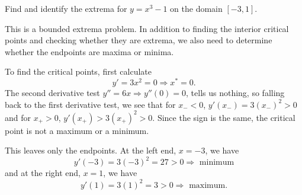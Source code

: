 \documentclass{ximera}
\author{Emma Smith Zbarsky}
\begin{document}
\begin{exercise}

Find and identify the extrema for $y = x^3-1$ on the domain $[-3,1]$.


\begin{hint}
This is a bounded extrema problem. In addition to finding the interior
critical points and checking whether they are extrema, we also need to
determine whether the endpoints are maxima or minima.
\end{hint}


\begin{hint}
To find the critical points, first calculate
\[y' = 3x^2 = 0 \Rightarrow x^*=0.\] The second derivative test
$y'' = 6x \Rightarrow y''(0)=0$, tells us nothing, so falling back to
the first derivative test, we see that for $x_- < 0$,
$y'(x_-)=3(x_-)^2 > 0$ and for $x_+>0$, $y'(x_+) > 3(x_+)^2 > 0$. Since
the sign is the same, the critical point is not a maximum or a minimum.

This leaves only the endpoints. At the left end, $x=-3$, we have
\[y'(-3) = 3(-3)^2 = 27 > 0 \Rightarrow \mbox{ minimum}\] and at the
right end, $x=1$, we have
\[y'(1) = 3(1)^2 = 3 > 0 \Rightarrow \mbox{ maximum}.\]
\end{hint}


\begin{multipleChoice}
\end{multipleChoice}

\end{exercise}
\end{document}
